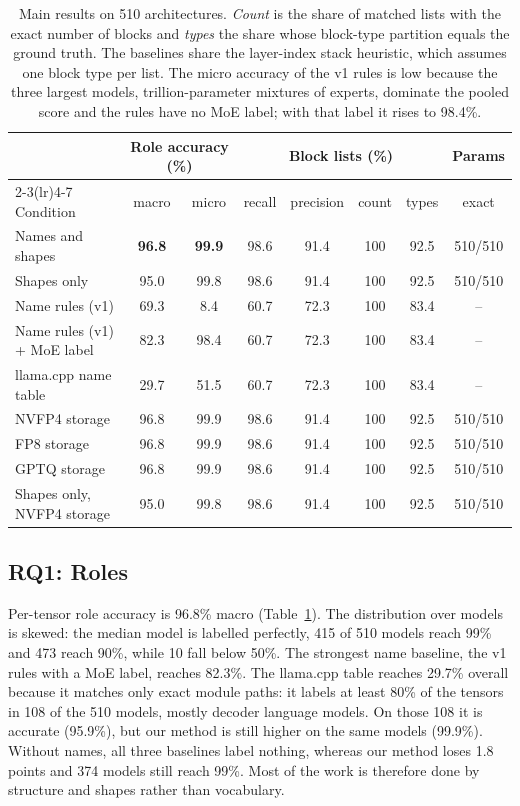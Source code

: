 \documentclass[11pt]{article}
\begin{document}
\begin{table}[t]
\centering
\small
\begin{tabular}{lccccccc}
\toprule
& \multicolumn{2}{c}{Role accuracy (\%)} & \multicolumn{4}{c}{Block lists (\%)} & Params \\
\cmidrule(lr){2-3}\cmidrule(lr){4-7}
Condition & macro & micro & recall & precision & count & types & exact \\
\midrule
Names and shapes & \textbf{96.8} & \textbf{99.9} & 98.6 & 91.4 & 100 & 92.5 & 510/510 \\
Shapes only & 95.0 & 99.8 & 98.6 & 91.4 & 100 & 92.5 & 510/510 \\
Name rules (v1) & 69.3 & 8.4 & 60.7 & 72.3 & 100 & 83.4 & -- \\
Name rules (v1) + MoE label & 82.3 & 98.4 & 60.7 & 72.3 & 100 & 83.4 & -- \\
llama.cpp name table & 29.7 & 51.5 & 60.7 & 72.3 & 100 & 83.4 & -- \\
\midrule
NVFP4 storage & 96.8 & 99.9 & 98.6 & 91.4 & 100 & 92.5 & 510/510 \\
FP8 storage & 96.8 & 99.9 & 98.6 & 91.4 & 100 & 92.5 & 510/510 \\
GPTQ storage & 96.8 & 99.9 & 98.6 & 91.4 & 100 & 92.5 & 510/510 \\
Shapes only, NVFP4 storage & 95.0 & 99.8 & 98.6 & 91.4 & 100 & 92.5 & 510/510 \\
\bottomrule
\end{tabular}
\caption{Main results on 510 architectures. \emph{Count} is the share of matched lists with the exact number of blocks and \emph{types} the share whose block-type partition equals the ground truth. The baselines share the layer-index stack heuristic, which assumes one block type per list. The micro accuracy of the v1 rules is low because the three largest models, trillion-parameter mixtures of experts, dominate the pooled score and the rules have no MoE label; with that label it rises to 98.4\%.}
\label{tab:main}
\end{table}

\subsection{RQ1: Roles}
Per-tensor role accuracy is 96.8\% macro (Table~\ref{tab:main}). The distribution over models is skewed: the median model is labelled perfectly, 415 of 510 models reach 99\% and 473 reach 90\%, while 10 fall below 50\%. The strongest name baseline, the v1 rules with a MoE label, reaches 82.3\%. The llama.cpp table reaches 29.7\% overall because it matches only exact module paths: it labels at least 80\% of the tensors in 108 of the 510 models, mostly decoder language models. On those 108 it is accurate (95.9\%), but our method is still higher on the same models (99.9\%). Without names, all three baselines label nothing, whereas our method loses 1.8 points and 374 models still reach 99\%. Most of the work is therefore done by structure and shapes rather than vocabulary.
\end{document}

